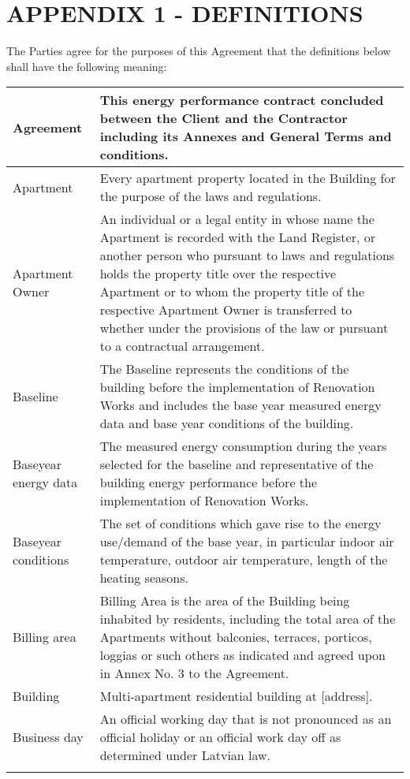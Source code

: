 \section{APPENDIX 1 {-} DEFINITIONS}
The Parties agree for the purposes of this Agreement that the definitions below shall have the following meaning:

\begin{center}
\begin{longtabu}{|X|X[3]|}  \hline{}
	Agreement & This energy performance contract concluded between the Client and the Contractor including its Annexes and General Terms and conditions. \\ \hline{}
	Apartment & Every apartment property located in the Building for the purpose of the laws and regulations. \\ \hline{}
	Apartment Owner & An individual or a legal entity in whose name the
			  Apartment is recorded with the Land Register, or another person who pursuant to
			  laws and regulations holds the property title over the respective Apartment or
			  to whom the property title of the respective Apartment Owner is transferred to
			  whether under the provisions of the law or pursuant to a contractual
			  arrangement. \\ \hline{}
	Baseline & The Baseline represents the conditions of the building
		   before the implementation of Renovation Works and includes the base year
		   measured energy data and base year conditions of the building. \\ \hline{}
	Baseyear energy data & The measured energy consumption during the years
			       selected for the baseline and representative of the building energy performance
			       before the implementation of Renovation Works. \\ \hline{}
	Baseyear conditions & The set of conditions which gave rise to the
			      energy use/demand of the base year, in particular indoor air temperature,
			      outdoor air temperature, length of the heating seasons. \\ \hline{}
	Billing area & Billing Area is the area of the Building being inhabited
		       by residents, including the total area of the Apartments without balconies,
		       terraces, porticos, loggias or such others as indicated and agreed upon in
		       Annex No. 3 to the Agreement. \\ \hline{}
	Building & Multi{-}apartment residential building at [address]. \\ \hline{}
	Business day & An official working day that is not pronounced as an official holiday or an official work day off as determined under Latvian law. \\ \hline{}

\end{longtabu}
\end{center}
